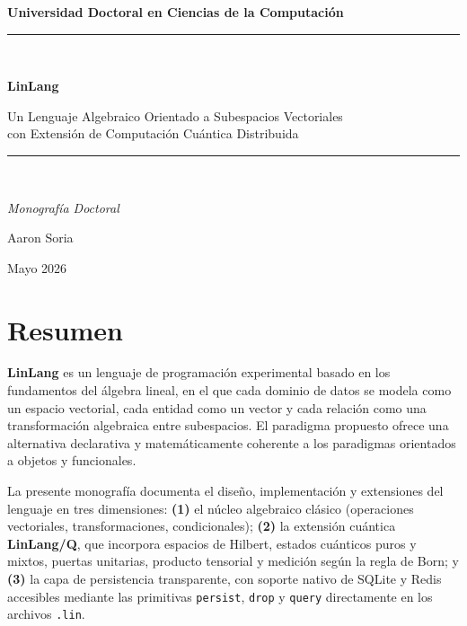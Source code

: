 \documentclass[12pt, a4paper, openany]{report}
\theoremstyle{definition}
\newcommand{\linlang}{\textbf{LinLang}}
\newcommand{\linlangQ}{\textbf{LinLang/Q}}
\begin{document}

\begin{titlepage}
  \centering
  \vspace*{2cm}
  {\Large\bfseries Universidad Doctoral en Ciencias de la Computación\par}
  \vspace{1.5cm}
  \rule{\linewidth}{0.5pt}\\[0.4cm]
  {\Huge\bfseries LinLang\par}
  \vspace{0.3cm}
  {\Large Un Lenguaje Algebraico Orientado a Subespacios Vectoriales\\
         con Extensión de Computación Cuántica Distribuida\par}
  \rule{\linewidth}{0.5pt}\\[1.5cm]
  {\large\itshape Monografía Doctoral\par}
  \vspace{0.8cm}
  {\large Aaron Soria\par}
  \vfill
  {\large Mayo 2026\par}
\end{titlepage}

\cleardoublepage

\chapter*{Resumen}

\linlang{} es un lenguaje de programación experimental basado en los fundamentos del álgebra lineal, en el que cada dominio de datos se modela como un espacio vectorial, cada entidad como un vector y cada relación como una transformación algebraica entre subespacios. El paradigma propuesto ofrece una alternativa declarativa y matemáticamente coherente a los paradigmas orientados a objetos y funcionales.

La presente monografía documenta el diseño, implementación y extensiones del lenguaje en tres dimensiones: \textbf{(1)} el núcleo algebraico clásico (operaciones vectoriales, transformaciones, condicionales); \textbf{(2)} la extensión cuántica \linlangQ{}, que incorpora espacios de Hilbert, estados cuánticos puros y mixtos, puertas unitarias, producto tensorial y medición según la regla de Born; y \textbf{(3)} la capa de persistencia transparente, con soporte nativo de SQLite y Redis accesibles mediante las primitivas \texttt{persist}, \texttt{drop} y \texttt{query} directamente en los archivos \texttt{.lin}.
\end{document}
